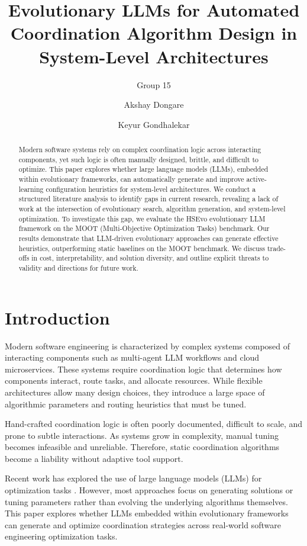 \documentclass[sigconf,nonacm]{acmart}
\title{Evolutionary LLMs for Automated Coordination Algorithm Design in System-Level Architectures}
\subtitle{Group 15}
\author{Akshay Dongare}
\affiliation{
  \institution{North Carolina State University}
  \city{Raleigh}
  \state{NC}
  \country{USA}
}
\author{Keyur Gondhalekar}
\affiliation{
  \institution{North Carolina State University}
  \city{Raleigh}
  \state{NC}
  \country{USA}
}
\begin{document}
\begin{abstract}
Modern software systems rely on complex coordination logic across interacting components, yet such logic is often manually designed, brittle, and difficult to optimize. This paper explores whether large language models (LLMs), embedded within evolutionary frameworks, can automatically generate and improve active-learning configuration heuristics for system-level architectures. We conduct a structured literature analysis to identify gaps in current research, revealing a lack of work at the intersection of evolutionary search, algorithm generation, and system-level optimization. To investigate this gap, we evaluate the HSEvo evolutionary LLM framework on the MOOT (Multi-Objective Optimization Tasks) benchmark. Our results demonstrate that LLM-driven evolutionary approaches can generate effective heuristics, outperforming static baselines on the MOOT benchmark. We discuss trade-offs in cost, interpretability, and solution diversity, and outline explicit threats to validity and directions for future work.
\end{abstract}

\maketitle

\section{Introduction}

Modern software engineering is characterized by complex systems composed of interacting components such as multi-agent LLM workflows and cloud microservices. These systems require coordination logic that determines how components interact, route tasks, and allocate resources. While flexible architectures allow many design choices, they introduce a large space of algorithmic parameters and routing heuristics that must be tuned.

Hand-crafted coordination logic is often poorly documented, difficult to scale, and prone to subtle interactions. As systems grow in complexity, manual tuning becomes infeasible and unreliable. Therefore, static coordination algorithms become a liability without adaptive tool support.

Recent work has explored the use of large language models (LLMs) for optimization tasks \cite{romera2023mathematical}. However, most approaches focus on generating solutions or tuning parameters rather than evolving the underlying algorithms themselves. This paper explores whether LLMs embedded within evolutionary frameworks can generate and optimize coordination strategies across real-world software engineering optimization tasks.
\end{document}
